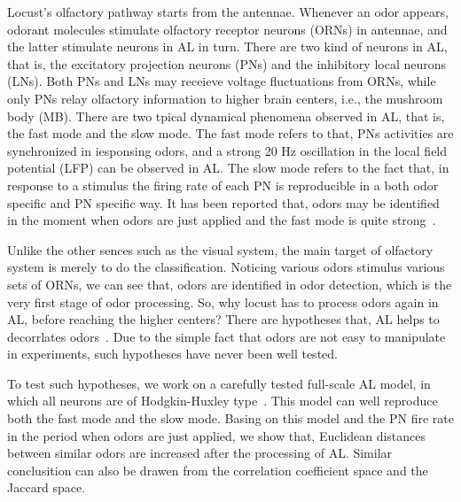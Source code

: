 \documentclass[12pt, a4paper]{article}
\begin{document}
Locust's olfactory pathway starts from the antennae. Whenever an odor appears, odorant molecules stimulate olfactory receptor neurons (ORNs) in antennae, and the latter stimulate neurons in AL in turn. There are two kind of neurons in AL, that is, the excitatory projection neurons (PNs) and the inhibitory local neurons (LNs). Both PNs and LNs may receieve voltage fluctuations from ORNs, while only PNs relay olfactory information to higher brain centers, i.e., the mushroom body (MB). %
There are two tpical dynamical phenomena observed in AL, that is, the fast mode and the slow mode. The fast mode refers to that, PNs activities are synchronized in iesponsing odors, and a strong 20 Hz oscillation in the local field potential (LFP) can be observed in AL. The slow mode refers to the fact that, in response to a stimulus the firing rate of each PN is reproducible in a both odor specific and PN specific way. It has been reported that, odors may be identified in the moment when odors are just applied and the fast mode is quite strong~\citep{}.

Unlike the other sences such as the visual system, the main target of olfactory system is merely to do the classification. Noticing various odors stimulus various sets of ORNs, we can see that, odors are identified in odor detection, which is the very first stage of odor processing. So, why locust has to process odors again in AL, before reaching the higher centers? There are hypotheses that, AL helps to decorrlates odors~\citep{}. Due to the simple fact that odors are not easy to manipulate in experiments, such hypotheses have never been well tested.


To test such hypotheses, we work on a carefully tested full-scale AL model, in which all neurons are of Hodgkin-Huxley type~\citep{Patel2009, Patel2013}. This model can well reproduce both the fast mode and the slow mode. Basing on this model and the PN fire rate in the period when odors are just applied, we show that, Euclidean distances between similar odors are increased after the processing of AL. Similar conclusition can also be drawen from the correlation coefficient space and the Jaccard space. %
\cdots
\end{document}
